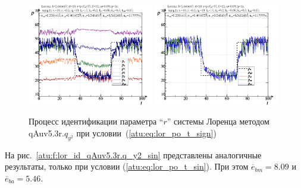 \begin{figure}[h!]
  \centerline{
    \includegraphics[width=0.49\textwidth]{p/cha/lor/qAuv5.3r/lor_qAuv5_3r_qy2-p_t_pi_sign.png}
    \hfill
    \includegraphics[width=0.49\textwidth]{p/cha/lor/qAuv5.3r/lor_qAuv5_3r_qy2-p_t_pz_sign.png}
  }
  \caption{Процесс идентификации параметра ``$r$'' системы Лоренца методом qAuv5.3r.$q_{y^2}$ при условии~(\ref{atu:eq:lor_po_t_sign})}
  \label{atu:f:lor_id_qAuv5.3r.q_y2_sign}
\end{figure}


На рис.~\ref{atu:f:lor_id_qAuv5.3r.q_y2_sin} представлены аналогичные результаты,
только при условии (\ref{atu:eq:lor_po_t_sin}).
При этом
$\overline{e}_{bm}=8.09$
и
$\overline{e}_{ba}=5.46$.


